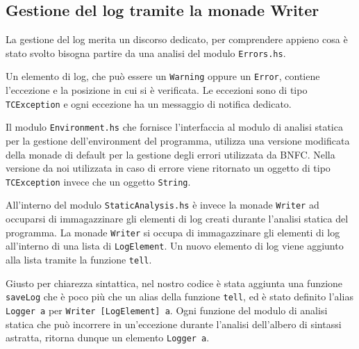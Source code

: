 \subsection{Gestione del log tramite la monade Writer}
La gestione del log merita un discorso dedicato, per comprendere appieno cosa è stato svolto bisogna partire da una analisi del modulo \texttt{Errors.hs}.

Un elemento di log, che può essere un \texttt{Warning} oppure un \texttt{Error}, contiene l'eccezione e la posizione in cui si è verificata.
Le eccezioni sono di tipo \texttt{TCException} e ogni eccezione ha un messaggio di notifica dedicato.

Il modulo \texttt{Environment.hs} che fornisce l'interfaccia al modulo di analisi statica per la gestione dell'environment del programma, utilizza una versione modificata della monade di default per la gestione degli errori utilizzata da BNFC. Nella versione da noi utilizzata in caso di errore viene ritornato un oggetto di tipo \texttt{TCException} invece che un oggetto \texttt{String}.

All'interno del modulo \texttt{StaticAnalysis.hs} è invece la monade \texttt{Writer} ad occuparsi di immagazzinare gli elementi di log creati durante l'analisi statica del programma.
La monade \texttt{Writer} si occupa di immagazzinare gli elementi di log all'interno di una lista di \texttt{LogElement}. Un nuovo elemento di log viene aggiunto alla lista tramite la funzione \texttt{tell}.

Giusto per chiarezza sintattica, nel nostro codice è stata aggiunta una funzione \texttt{saveLog} che è poco più che un alias della funzione \texttt{tell}, ed è stato definito l'alias \texttt{Logger a} per \texttt{Writer [LogElement] a}.
Ogni funzione del modulo di analisi statica che può incorrere in un'eccezione durante l'analisi dell'albero di sintassi astratta, ritorna dunque un elemento \texttt{Logger a}.
